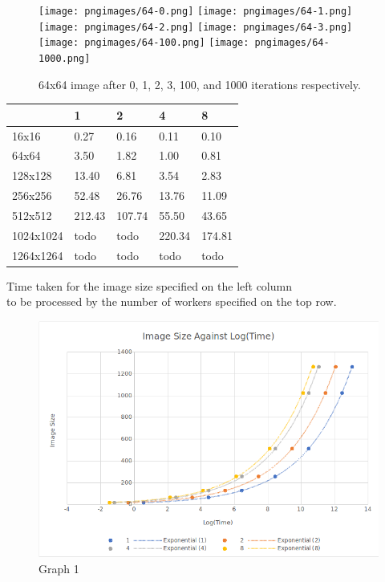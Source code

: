 \documentclass{article}
\begin{document}
\begin{figure}[H]
\centering
\texttt{[image: pngimages/64-0.png]}
\texttt{[image: pngimages/64-1.png]}
\texttt{[image: pngimages/64-2.png]}
\texttt{[image: pngimages/64-3.png]}
\texttt{[image: pngimages/64-100.png]}
\texttt{[image: pngimages/64-1000.png]}
\caption{64x64 image after 0, 1, 2, 3, 100, and 1000 iterations respectively.}
\end{figure}

\begin{center}
\begin{tabular}{ | l | l | l | l | l |}
\hline
   & 1 & 2 & 4 & 8 \\ \hline
16x16 & 0.27 & 0.16 & 0.11 & 0.10 \\ \hline
64x64 & 3.50 & 1.82 & 1.00 & 0.81 \\ \hline
128x128 & 13.40 & 6.81 & 3.54 & 2.83 \\ \hline
256x256 & 52.48 & 26.76 & 13.76 & 11.09 \\ \hline
512x512 & 212.43 & 107.74 & 55.50 & 43.65 \\ \hline
1024x1024 & todo & todo & 220.34 & 174.81 \\ \hline
1264x1264 & todo & todo & todo & todo \\ \hline
\end{tabular}

\vspace{5mm}

Time taken for the image size specified on the left column \\
to be processed by the number of workers specified on the top row.

\end{center}

\newpage

\begin{figure}[H]
\centering
\includegraphics[width=15cm]{ImvsLog(Time)(BeforePow).png}
\caption{Graph 1}
\end{figure}
\end{document}
